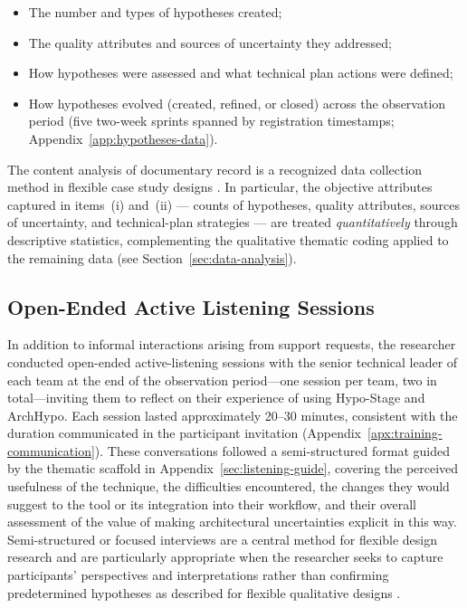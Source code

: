 \begin{itemize}
  \item[(i)] The number and types of hypotheses created;
  \item[(ii)] The quality attributes and sources of uncertainty they addressed;
  \item[(iii)] How hypotheses were assessed and what technical plan actions were defined;
  \item[(iv)] How hypotheses evolved (created, refined, or closed) across the observation period (five two-week sprints spanned by registration timestamps; Appendix~\ref{app:hypotheses-data}).
\end{itemize}

The content analysis of documentary record is a recognized data collection method in flexible case study designs \citep{robson2016}. In particular, the objective attributes captured in items~(i) and~(ii) --- counts of hypotheses, quality attributes, sources of uncertainty, and technical-plan strategies --- are treated \emph{quantitatively} through descriptive statistics, complementing the qualitative thematic coding applied to the remaining data (see Section~\ref{sec:data-analysis}).

\subsection{Open-Ended Active Listening Sessions}
\label{subsec:active-listening}

In addition to informal interactions arising from support requests, the researcher
conducted open-ended active-listening sessions with the senior technical leader of
each team at the end of the observation period---one session per team, two in
total---inviting them to reflect on their experience of using Hypo-Stage
and ArchHypo. Each session lasted approximately 20--30 minutes, consistent with
the duration communicated in the participant invitation
(Appendix~\ref{apx:training-communication}). These conversations followed a
semi-structured format guided by the thematic scaffold in
Appendix~\ref{sec:listening-guide}, covering the
perceived usefulness of the technique, the difficulties encountered, the changes they
would suggest to the tool or its integration into their workflow, and their overall
assessment of the value of making architectural uncertainties explicit in this way.
Semi-structured or focused interviews are a central method for flexible design
research and are particularly appropriate when the researcher seeks to capture
participants' perspectives and interpretations rather than confirming predetermined
hypotheses as described for flexible qualitative designs \citep{robson2016}.

